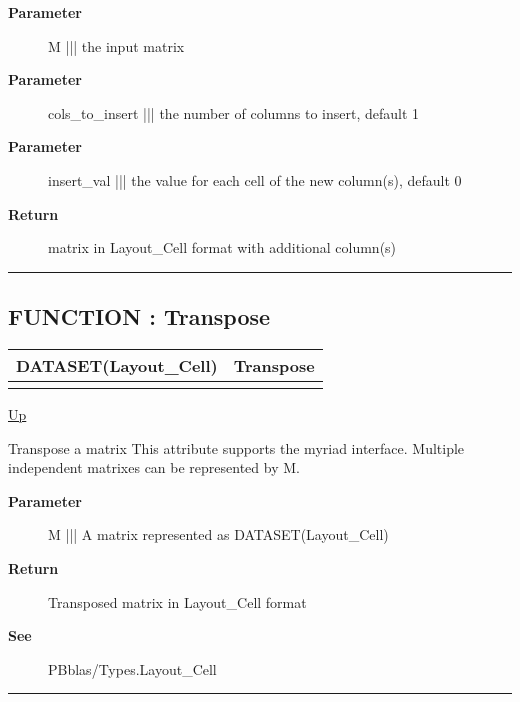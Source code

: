 \par
\begin{description}
\item [\textbf{Parameter}] M ||| the input matrix
\item [\textbf{Parameter}] cols\_to\_insert ||| the number of columns to insert, default 1
\item [\textbf{Parameter}] insert\_val ||| the value for each cell of the new column(s), default 0
\item [\textbf{Return}] matrix in Layout\_Cell format with additional column(s)
\end{description}

\rule{\textwidth}{0.4pt}
\subsection*{FUNCTION : Transpose}
\hypertarget{ecldoc:pbblas.matutils.transpose}{}

{\renewcommand{\arraystretch}{1.5}
\begin{tabularx}{\textwidth}{|>{\raggedright\arraybackslash}l|X|}
\hline
\hspace{0pt}DATASET(Layout\_Cell) & Transpose \\
\hline
\multicolumn{2}{|>{\raggedright\arraybackslash}X|}{\hspace{0pt}(DATASET(Layout\_Cell) M)} \\
\hline
\end{tabularx}
}

\hyperlink{ecldoc:PBblas.MatUtils}{Up}

\par
Transpose a matrix This attribute supports the myriad interface. Multiple independent matrixes can be represented by M.

\par
\begin{description}
\item [\textbf{Parameter}] M ||| A matrix represented as DATASET(Layout\_Cell)
\item [\textbf{Return}] Transposed matrix in Layout\_Cell format
\item [\textbf{See}] PBblas/Types.Layout\_Cell
\end{description}

\rule{\textwidth}{0.4pt}


